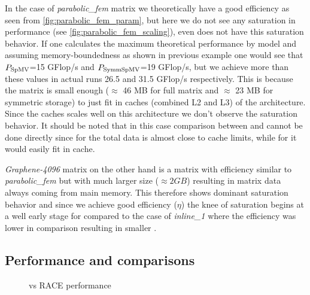In the case of \emph{parabolic\_fem} matrix we theoretically have a good efficiency as seen from \cref{fig:parabolic_fem_param}, but here we do not see any saturation in performance (see \cref{fig:parabolic_fem_scaling}), even \SpMV does not have this saturation behavior. If one calculates the maximum  theoretical performance by \roofline model and assuming memory-boundedness as shown in previous example one would see that $P_\mathrm{SpMV}$=15 GFlop/s and $P_\mathrm{SymmSpMV}$=19 GFlop/s, but we achieve more than these values in actual runs 26.5 and 31.5 GFlop/s respectively. This is because the matrix is small enough ($\approx$ 46 MB for full matrix and $\approx$ 23 MB for symmetric storage) to just fit in caches (combined L2 and L3) of the \SKX architecture. Since the caches scales well on this architecture we don't observe the saturation behavior. It should be noted that in this case comparison between \SpMV and \SymmSpmv cannot be done directly since for \SpMV the total data is almost close to cache limits, while for \SymmSpmv it would easily fit in cache.

\emph{Graphene-4096} matrix on the other hand is a matrix with efficiency similar to \emph{parabolic\_fem} but with much larger size ($\approx 2 GB$) resulting in matrix data always coming from main memory. This therefore shows dominant saturation behavior and since we achieve good efficiency ($\eta$) the knee of saturation begins at a well early stage for \SymmSpmv compared to  the case of \emph{inline\_1} where the efficiency was lower in comparison resulting in smaller \threadEff.

\subsection{Performance and comparisons}

\begin{figure}[thbp]
	\centering
	\hspace{1em}
	\caption{\SpMV vs RACE \SymmSpmv performance}
	\label{fig:SpMV_vs_SymmSpMV}
\end{figure}
